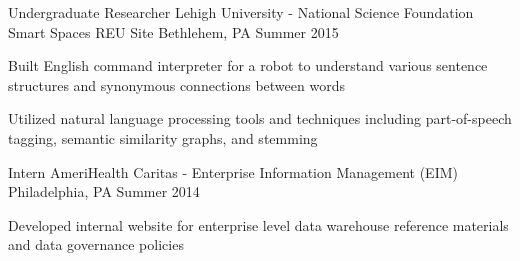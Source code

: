 \begin{cventries}
  \cventry
    {Undergraduate Researcher} %
    {Lehigh University - National Science Foundation Smart Spaces REU Site} %
    {Bethlehem, PA} %
    {Summer 2015} %
    {
      \begin{cvitems} %
        \item {Built English command interpreter for a robot to understand various sentence structures and synonymous connections between words}
        \item {Utilized natural language processing tools and techniques including part-of-speech tagging, semantic similarity graphs, and stemming}
      \end{cvitems}
    }

  \cventry
    {Intern} %
    {AmeriHealth Caritas - Enterprise Information Management (EIM)} %
    {Philadelphia, PA} %
    {Summer 2014} %
    {
      \begin{cvitems} %
        \item {Developed internal website for enterprise level data warehouse reference materials and data governance policies}
      \end{cvitems}
    }
\end{cventries}
